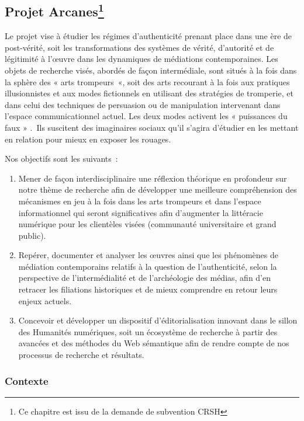 \documentclass[
  a4paper,
  DIV=11,
  numbers=noendperiod]{scrreprt}
\begin{document}
\subsection[Projet Arcanes]{\texorpdfstring{Projet
Arcanes\footnote{Ce chapitre est issu de la demande de subvention CRSH}}{Projet Arcanes}}\label{projet-arcanespositionnements-7}

Le projet vise à étudier les régimes d'authenticité prenant place dans
une ère de post-vérité, soit les transformations des systèmes de vérité,
d'autorité et de légitimité à l'œuvre dans les dynamiques de médiations
contemporaines. Les objets de recherche visés, abordés de façon
intermédiale, sont situés à la fois dans la sphère des « arts
trompeurs~«, soit des arts recourant à la fois aux pratiques
illusionnistes et aux modes fictionnels en utilisant des stratégies de
tromperie, et dans celui des techniques de persuasion ou de manipulation
intervenant dans l'espace communicationnel actuel. Les deux modes
activent les « puissances du faux » .~Ils suscitent des imaginaires
sociaux qu'il s'agira d'étudier en les mettant en relation pour mieux en
exposer les rouages.~

Nos objectifs sont les suivants~:~

\begin{enumerate}
\def\labelenumi{\arabic{enumi}.}
\item
  Mener de façon interdisciplinaire une réflexion théorique en
  profondeur sur notre thème de recherche afin de développer une
  meilleure compréhension des mécanismes en jeu à la fois dans les arts
  trompeurs et dans l'espace informationnel qui seront significatives
  afin d'augmenter la littéracie numérique pour les clientèles visées
  (communauté universitaire et grand public).
\item
  Repérer, documenter et analyser les œuvres ainsi que les phénomènes de
  médiation contemporains relatifs à la question de l'authenticité,
  selon la perspective de l'intermédialité et de l'archéologie des
  médias, afin d'en retracer les filiations historiques et de mieux
  comprendre en retour leurs enjeux actuels.
\item
  Concevoir et développer un dispositif d'éditorialisation innovant dans
  le sillon des Humanités numériques, soit un écosystème de recherche à
  partir des avancées et des méthodes du Web sémantique afin de rendre
  compte de nos processus de recherche et résultats.~
\end{enumerate}

\subsubsection{Contexte}\label{contexte}
\end{document}
